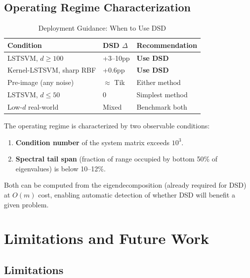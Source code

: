 \documentclass[preprint,review,12pt]{elsarticle}
\begin{document}
\subsection{Operating Regime Characterization}

\begin{table}[!t]
\centering
\caption{Deployment Guidance: When to Use DSD}
\label{tab:regime_summary}
\begin{tabular}{@{}p{3.5cm}p{1.5cm}p{2.5cm}@{}}
\toprule
\textbf{Condition} & \textbf{DSD $\Delta$} & \textbf{Recommendation} \\
\midrule
LSTSVM, $d \geq 100$ & +3--10pp & \textbf{Use DSD} \\
Kernel-LSTSVM, sharp RBF & +0.6pp & \textbf{Use DSD} \\
Pre-image (any noise) & $\approx$ Tik & Either method \\
LSTSVM, $d \leq 50$ & 0 & Simplest method \\
Low-$d$ real-world & Mixed & Benchmark both \\
\bottomrule
\end{tabular}
\end{table}

The operating regime is characterized by two observable conditions:
\begin{enumerate}
\item \textbf{Condition number} of the system matrix exceeds $10^3$.
\item \textbf{Spectral tail span} (fraction of range occupied by bottom 50\% of eigenvalues) is below 10--12\%.
\end{enumerate}
Both can be computed from the eigendecomposition (already required for DSD) at $O(m)$ cost, enabling automatic detection of whether DSD will benefit a given problem.


\section{Limitations and Future Work}
\label{sec:limitations}

\subsection{Limitations}
\end{document}
